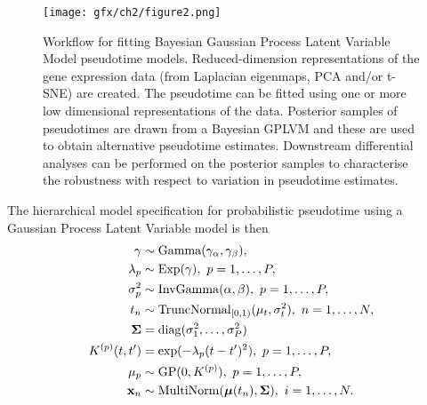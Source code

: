 \begin{figure}
\centering
  \texttt{[image: gfx/ch2/figure2.png]}
  \caption[Workflow for fitting Bayesian Gaussian Process Latent Variable Model pseudotime models.]{Workflow for fitting Bayesian Gaussian Process Latent Variable Model pseudotime models. Reduced-dimension representations of the gene expression data (from Laplacian eigenmaps, PCA and/or t-SNE) are created. The pseudotime can be fitted using one or more low dimensional representations of the data. Posterior samples of pseudotimes are drawn from a Bayesian GPLVM and these are used to obtain alternative pseudotime estimates. Downstream differential analyses can be performed on the posterior samples to characterise the robustness with respect to variation in pseudotime estimates.} \label{fig:workflow}
\end{figure}

The hierarchical model specification for probabilistic pseudotime using a Gaussian Process Latent Variable model is then
\begin{equation} \label{eq:model}
\begin{aligned}
	\gamma & \sim \mathrm{Gamma}(\gamma_\alpha, \gamma_\beta), \\
	\lambda_p & \sim  \mathrm{Exp}(\gamma), ~p=1,\dots, P, \\
	 \sigma_p^2 & \sim   \mathrm{InvGamma}(\alpha, \beta), ~p=1,\dots, P, \\
	t_n & \sim
			\mathrm{TruncNormal}_{[0, 1)}(\mu_t, \sigma_t^2), ~n=1,\dots,N,\\
	{\bm \Sigma} & =  \mathrm{diag}(\sigma_1^2, \dots, \sigma_P^2) \\
	K^{(p)}(t, t') & = \exp( -\lambda_p (t-t')^2 ), ~p=1,\dots, P, \\
	\mu_p &\sim  \mathrm{GP}(0, K^{(p)}), ~ p=1,\dots,P,  \\
	\mathbf{x}_{n} & \sim  \mathrm{MultiNorm}( \bm{\mu}(t_n), \bm{\Sigma} ), ~i=1,\dots,N.
\end{aligned}
\end{equation}\label{eq:pseudogp_model}

